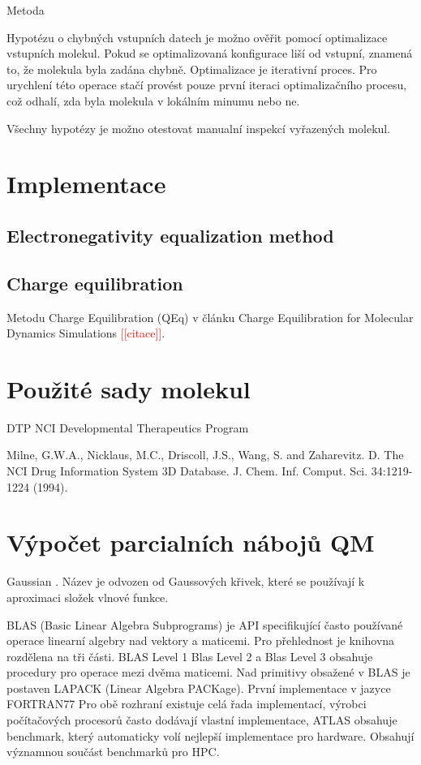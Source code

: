 \documentclass[10pt,draft,oneside]{fithesis2}
\newcommand\fixme[1]{\textcolor{red}{[[#1]]}}
\begin{document}
Metoda

Hypotézu o chybných vstupních datech je možno ověřit pomocí optimalizace vstupních molekul. Pokud se optimalizovaná konfigurace liší od vstupní, znamená to, že molekula byla zadána chybně. Optimalizace je iterativní proces. Pro urychlení této operace stačí provést pouze první iteraci optimalizačního procesu, což odhalí, zda byla molekula v lokálním minumu nebo ne.

Všechny hypotézy je možno otestovat manualní inspekcí vyřazených molekul.

\chapter{Implementace}

\section{Electronegativity equalization method}

\section{Charge equilibration}

Metodu Charge Equilibration (QEq) v článku Charge Equilibration for Molecular Dynamics Simulations \fixme{citace}.

\chapter{Použité sady molekul}

DTP NCI Developmental Therapeutics Program


Milne, G.W.A., Nicklaus, M.C., Driscoll, J.S., Wang, S. and Zaharevitz. D. The NCI Drug Information System 3D Database. J. Chem. Inf. Comput. Sci. 34:1219-1224 (1994).

\chapter{Výpočet parcialních nábojů QM}

Gaussian . Název je odvozen od Gaussových křivek, které se používají k aproximaci složek vlnové funkce.


BLAS (Basic Linear Algebra Subprograms) je API specifikující často používané operace linearní algebry nad vektory a maticemi. Pro přehlednost je knihovna rozdělena na tři části. BLAS Level 1 Blas Level 2 a Blas Level 3 obsahuje procedury pro operace mezi dvěma maticemi. Nad primitivy obsažené v BLAS je postaven LAPACK (Linear Algebra PACKage). První implementace v jazyce FORTRAN77 Pro obě rozhraní existuje celá řada implementací, výrobci počítačových procesorů často dodávají vlastní implementace, ATLAS obsahuje benchmark, který automaticky volí nejlepší implementace pro hardware. Obsahují významnou součást benchmarků pro HPC.
\end{document}
